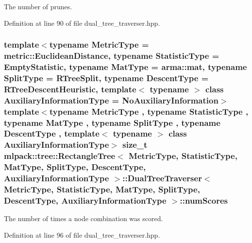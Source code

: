 The number of prunes. 



Definition at line 90 of file dual\+\_\+tree\+\_\+traverser.\+hpp.

\subsubsection[{num\+Scores}]{\setlength{\rightskip}{0pt plus 5cm}template$<$typename Metric\+Type  = metric\+::\+Euclidean\+Distance, typename Statistic\+Type  = Empty\+Statistic, typename Mat\+Type  = arma\+::mat, typename Split\+Type  = R\+Tree\+Split, typename Descent\+Type  = R\+Tree\+Descent\+Heuristic, template$<$ typename $>$ class Auxiliary\+Information\+Type = No\+Auxiliary\+Information$>$ template$<$typename Metric\+Type , typename Statistic\+Type , typename Mat\+Type , typename Split\+Type , typename Descent\+Type , template$<$ typename $>$ class Auxiliary\+Information\+Type$>$ size\+\_\+t {\bf mlpack\+::tree\+::\+Rectangle\+Tree}$<$ Metric\+Type, Statistic\+Type, Mat\+Type, {\bf Split\+Type}, {\bf Descent\+Type}, Auxiliary\+Information\+Type $>$\+::{\bf Dual\+Tree\+Traverser}$<$ Metric\+Type, Statistic\+Type, Mat\+Type, {\bf Split\+Type}, {\bf Descent\+Type}, Auxiliary\+Information\+Type $>$\+::num\+Scores\hspace{0.3cm}{\ttfamily [private]}}\label{classmlpack_1_1tree_1_1RectangleTree_1_1DualTreeTraverser_add565feea9cd2ea9800b75a8228de884}


The number of times a node combination was scored. 



Definition at line 96 of file dual\+\_\+tree\+\_\+traverser.\+hpp.

